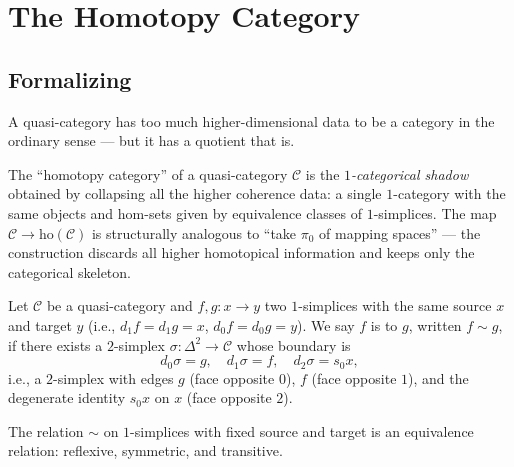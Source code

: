 \section{The Homotopy Category}
\label{sec:homotopy-category-qcat}

\subsection{Formalizing}

A quasi-category has too much higher-dimensional data to be a category in
the ordinary sense — but it has a quotient that is.

\begin{readernote}
The ``homotopy category'' of a quasi-category $\mathcal{C}$ is the
\emph{$1$-categorical shadow} obtained by collapsing all the higher
coherence data: a single $1$-category with the same objects and
hom-sets given by equivalence classes of $1$-simplices. The map
$\mathcal{C} \to \mathrm{ho}(\mathcal{C})$ is structurally analogous to
``take $\pi_0$ of mapping spaces'' — the construction discards all
higher homotopical information and keeps only the categorical skeleton.
\end{readernote}

\begin{definition}
\label{def:homotopy-1simplex}
Let $\mathcal{C}$ be a quasi-category and $f, g : x \to y$ two
$1$-simplices with the same source $x$ and target $y$ (i.e., $d_1 f =
d_1 g = x$, $d_0 f = d_0 g = y$). We say $f$ is  to $g$,
written $f \sim g$, if there exists a $2$-simplex $\sigma : \Delta^2 \to
\mathcal{C}$ whose boundary is
\begin{equation*}
  d_0 \sigma = g, \quad d_1 \sigma = f, \quad d_2 \sigma = s_0 x,
\end{equation*}
i.e., a $2$-simplex with edges $g$ (face opposite $0$), $f$ (face opposite
$1$), and the degenerate identity $s_0 x$ on $x$ (face opposite $2$).
\end{definition}

\begin{lemma}
\label{lem:homotopy-eq-rel}
The relation $\sim$ on $1$-simplices with fixed source and target is an
equivalence relation: reflexive, symmetric, and transitive.
\end{lemma}

